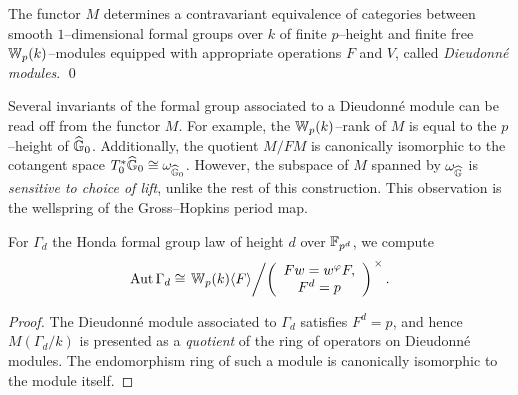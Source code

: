 \begin{theorem}
The functor $M$ determines a contravariant equivalence of categories between smooth $1$--dimensional formal groups over $k$ of finite $p$--height and finite free $\mathbb W_p(k)$--modules equipped with appropriate operations $F$ and $V$, called \textit{Dieudonn\'e modules}. \qed {}
\end{theorem}

\begin{remark}
Several invariants of the formal group associated to a Dieudonn\'e module can be read off from the functor $M$.  For example, the $\mathbb W_p(k)$--rank of $M$ is equal to the $p$--height of $\widehat{\mathbb G}_0$.  Additionally, the quotient $M / FM$ is canonically isomorphic to the cotangent space $T_0^* \widehat{\mathbb G}_0 \cong \omega_{\widehat{\mathbb G}_0}$.  However, the subspace of $M$ spanned by $\omega_{\widehat{\mathbb G}}$ is \emph{sensitive to choice of lift}, unlike the rest of this construction.  This observation is the wellspring of the Gross--Hopkins period map.
\end{remark}

\begin{corollary}\label{FormOfStabilizerGroup}
For $\Gamma_d$ the Honda formal group law of height $d$ over $\mathbb F_{p^d}$, we compute \[\operatorname{Aut} \Gamma_d \cong \left. \mathbb W_p(k) \langle F\rangle \middle/ \left( \begin{array}{c} Fw = w^\varphi F, \\ F^d = p \end{array} \right) \right.^\times.\]
\end{corollary}
\begin{proof}
The Dieudonn\'e module associated to $\Gamma_d$ satisfies $F^d = p$, and hence $M(\Gamma_d/k)$ is presented as a \emph{quotient} of the ring of operators on Dieudonn\'e modules.  The endomorphism ring of such a module is canonically isomorphic to the module itself.
\end{proof}


